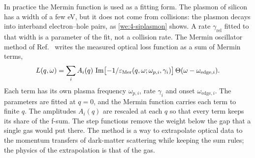 In practice the Mermin function is used as a fitting form. The plasmon of silicon has a width of a few eV, but it does not come from collisions: the plasmon decays into interband electron--hole pairs, as \cref{we:4-siplasmon} shows. A rate $\gamma_{\mathrm{rel}}$ fitted to that width is a parameter of the fit, not a collision rate. The Mermin oscillator method of Ref.~\cite[Eqs.~(20) and (21)]{knapen2021dark} writes the measured optical loss function as a sum of Mermin terms,
\begin{equation*}
  L(q,\omega) = \sum_i A_i(q)\,\operatorname{Im}\bigl[-1/\varepsilon_{\mathrm{Mer}}(q,\omega;\omega_{p,i},\gamma_i)\bigr]\,\Theta(\omega - \omega_{\mathrm{edge},i}) .
\end{equation*}
Each term has its own plasma frequency $\omega_{p,i}$, rate $\gamma_i$ and onset $\omega_{\mathrm{edge},i}$. The parameters are fitted at $q = 0$, and the Mermin function carries each term to finite $q$. The amplitudes $A_i(q)$ are rescaled at each $q$ so that every term keeps its share of the f-sum. The step functions remove the weight below the gap that a single gas would put there. The method is a way to extrapolate optical data to the momentum transfers of dark-matter scattering while keeping the sum rules; the physics of the extrapolation is that of the gas.

